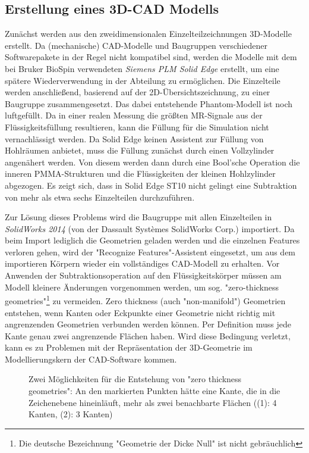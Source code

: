 \subsection{Erstellung eines 3D-CAD Modells}
Zunächst werden aus den zweidimensionalen Einzelteilzeichnungen 3D-Modelle erstellt. Da (mechanische) CAD-Modelle und Baugruppen verschiedener Softwarepakete in der Regel nicht kompatibel sind, werden die Modelle mit dem bei Bruker BioSpin verwendeten \textit{Siemens PLM Solid Edge} erstellt, um eine spätere Wiederverwendung in der Abteilung zu ermöglichen. Die Einzelteile werden anschließend, basierend auf der 2D-Übersichtszeichnung, zu einer Baugruppe zusammengesetzt. Das dabei entstehende Phantom-Modell ist noch luftgefüllt. Da in einer realen Messung die größten MR-Signale aus der Flüssigkeitsfüllung resultieren, kann die Füllung für die Simulation nicht vernachlässigt werden. Da Solid Edge keinen Assistent zur Füllung von Hohlräumen anbietet, muss die Füllung zunächst durch einen Vollzylinder angenähert werden. Von diesem werden dann durch eine Bool'sche Operation die inneren PMMA-Strukturen und die Flüssigkeiten der kleinen Hohlzylinder abgezogen. Es zeigt sich, dass in Solid Edge ST10 nicht gelingt eine Subtraktion von mehr als etwa sechs Einzelteilen durchzuführen.

Zur Lösung dieses Problems wird die Baugruppe mit allen Einzelteilen in \textit{SolidWorks 2014} (von der Dassault Systèmes SolidWorks Corp.) importiert. Da beim Import lediglich die Geometrien geladen werden und die einzelnen Features verloren gehen, wird der "Recognize Features"-Assistent eingesetzt, um aus dem importieren Körpern wieder ein vollständiges CAD-Modell zu erhalten. Vor Anwenden der Subtraktionsoperation auf den Flüssigkeitskörper müssen am Modell kleinere Änderungen vorgenommen werden, um sog. "zero-thickness geometries"\footnote{Die deutsche Bezeichnung "Geometrie der Dicke Null" ist nicht gebräuchlich} zu vermeiden. Zero thickness (auch  "non-manifold") Geometrien entstehen, wenn Kanten oder Eckpunkte einer Geometrie nicht richtig mit angrenzenden Geometrien verbunden werden können. Per Definition muss jede Kante genau zwei angrenzende Flächen haben. Wird diese Bedingung verletzt, kann es zu Problemen mit der Repräsentation der 3D-Geometrie im Modellierungskern der CAD-Software kommen.

\begin{figure}[H]
	\centering
	\caption[Zero Thickness]{Zwei Möglichkeiten für die Entstehung von "zero thickness geometries": An den markierten Punkten hätte eine Kante, die in die Zeichenebene hineinläuft, mehr als zwei benachbarte Flächen ((1): 4 Kanten, (2): 3 Kanten)}
	\label{fig:zeroThick}
\end{figure}

